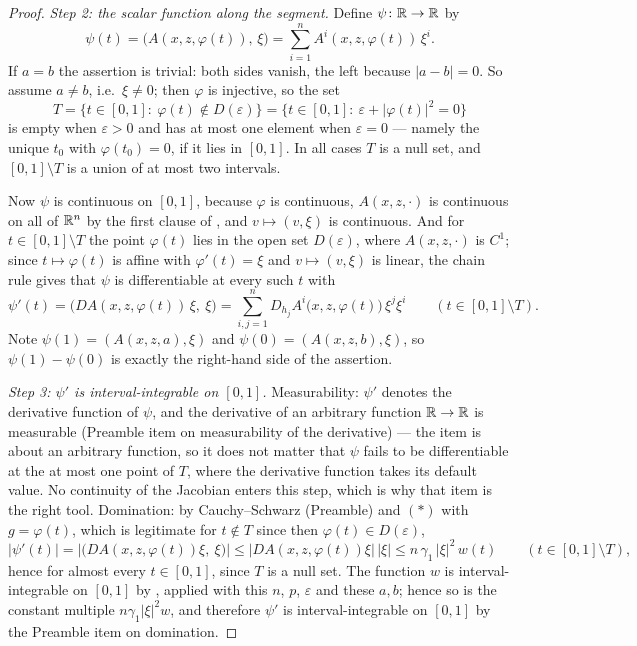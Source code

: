 \begin{proof}
\emph{Step 2: the scalar function along the segment.}  Define
$\psi\colon\mathbb{R}\to\mathbb{R}$ by
\[
\psi(t)=\bigl(A(x,z,\varphi(t)),\,\xi\bigr)
=\sum_{i=1}^nA^i(x,z,\varphi(t))\,\xi^i .
\]
If $a=b$ the assertion is trivial: both sides vanish, the left because
$|a-b|=0$.  So assume $a\ne b$, i.e.\ $\xi\ne0$; then $\varphi$ is injective, so
the set
\[
T=\{t\in[0,1]:\ \varphi(t)\notin D(\varepsilon)\}
=\{t\in[0,1]:\ \varepsilon+|\varphi(t)|^2=0\}
\]
is empty when $\varepsilon>0$ and has at most one element when
$\varepsilon=0$ --- namely the unique $t_0$ with $\varphi(t_0)=0$, if it lies in
$[0,1]$.  In all cases $T$ is a null set, and $[0,1]\setminus T$ is a union of
at most two intervals.

Now $\psi$ is continuous on $[0,1]$, because $\varphi$ is continuous,
$A(x,z,\cdot)$ is continuous on all of $\mathbb{R}^n$ by the first clause of
, and $v\mapsto(v,\xi)$ is continuous.  And for
$t\in[0,1]\setminus T$ the point $\varphi(t)$ lies in the open set
$D(\varepsilon)$, where $A(x,z,\cdot)$ is $C^1$; since
$t\mapsto\varphi(t)$ is affine with $\varphi'(t)=\xi$ and $v\mapsto(v,\xi)$ is
linear, the chain rule gives that $\psi$ is differentiable at every such $t$
with
\[
\psi'(t)=\bigl(DA(x,z,\varphi(t))\,\xi,\ \xi\bigr)
=\sum_{i,j=1}^nD_{h_j}A^i\bigl(x,z,\varphi(t)\bigr)\,\xi^j\xi^i
\qquad(t\in[0,1]\setminus T).
\]
Note $\psi(1)=(A(x,z,a),\xi)$ and $\psi(0)=(A(x,z,b),\xi)$, so
$\psi(1)-\psi(0)$ is exactly the right-hand side of the assertion.

\emph{Step 3: $\psi'$ is interval-integrable on $[0,1]$.}  Measurability:
$\psi'$ denotes the derivative function of $\psi$, and the derivative of an
arbitrary function $\mathbb{R}\to\mathbb{R}$ is measurable (Preamble item on measurability of
the derivative) --- the item is about an arbitrary function, so it does not
matter that $\psi$ fails to be differentiable at the at most one point of $T$,
where the derivative function takes its default value.  No continuity of the
Jacobian enters this step, which is why that item is the right tool.
Domination: by Cauchy--Schwarz (Preamble) and $(*)$ with $g=\varphi(t)$, which
is legitimate for $t\notin T$ since then $\varphi(t)\in D(\varepsilon)$,
\[
|\psi'(t)|=\bigl|\bigl(DA(x,z,\varphi(t))\xi,\ \xi\bigr)\bigr|
\le\bigl|DA(x,z,\varphi(t))\xi\bigr|\,|\xi|
\le n\,\gamma_1\,|\xi|^2\,w(t)\qquad(t\in[0,1]\setminus T),
\]
hence for almost every $t\in[0,1]$, since $T$ is a null set.
The function $w$ is interval-integrable on $[0,1]$ by
, applied with this $n$, $p$, $\varepsilon$
and these $a,b$; hence so is the constant multiple
$n\gamma_1|\xi|^2w$, and therefore $\psi'$ is interval-integrable on $[0,1]$ by
the Preamble item on domination.


\end{proof}
